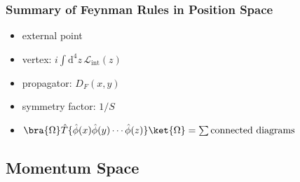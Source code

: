 \subsubsection{Summary of Feynman Rules in Position Space}

\begin{itemize}
    \item external point
    \item vertex: \(i \int \mathrm{d}^4 z \, \mathcal{L}_{\text{int}} (z)\)
    \item propagator: \(D_F (x,y)\)
    \item symmetry factor: \(1/S\)
    \item \(\bra{\Omega} \hat{T} \{ \hat{\phi} (x) \hat{\phi} (y) \cdots \hat{\phi} (z) \} \ket{\Omega} = \sum \text{connected diagrams}\)
\end{itemize}

\subsection{Momentum Space}

